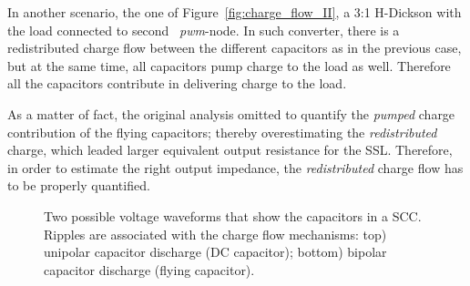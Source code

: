 In another scenario, the one of Figure~\ref{fig:charge_flow_II},  a 3:1 H-Dickson with the load connected to second ~\emph{pwm}-node. In such converter, there is a redistributed charge flow between the different capacitors as in the previous case, but at the same time, all capacitors pump charge to the load as well. Therefore all the capacitors  contribute in delivering charge to the load.

As a matter of fact, the original analysis omitted to quantify the \emph{pumped} charge contribution of the flying capacitors; thereby overestimating the \emph{redistributed} charge, which leaded larger equivalent output resistance for the SSL. Therefore, in order to estimate the right output impedance, the \emph{redistributed} charge flow has to be properly quantified.\\

\begin{figure}[!h]
\centering

\caption{Two possible voltage waveforms that show the capacitors in a SCC. Ripples are associated with the charge flow mechanisms: top) unipolar capacitor discharge (DC capacitor); bottom) bipolar capacitor discharge (flying capacitor).}
\label{fig:cap_riples}
\end{figure}

